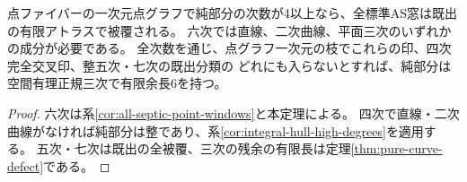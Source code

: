 \begin{corollary}\label{cor:point-curve-high-coverage}
点ファイバーの一次元点グラフで純部分の次数が4以上なら、全標準AS窓は既出の有限アトラスで被覆される。
六次では直線、二次曲線、平面三次のいずれかの成分が必要である。
全次数を通じ、点グラフ一次元の枝でこれらの印、四次完全交叉印、整五次・七次の既出分類の
どれにも入らないとすれば、純部分は空間有理正規三次で有限余長6を持つ。
\end{corollary}
\begin{proof}
六次は系\ref{cor:all-septic-point-windows}と本定理による。
四次で直線・二次曲線がなければ純部分は整であり、系\ref{cor:integral-hull-high-degrees}を適用する。
五次・七次は既出の全被覆、三次の残余の有限長は定理\ref{thm:pure-curve-defect}である。
\end{proof}
